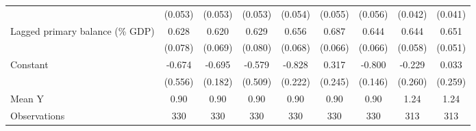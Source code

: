 {\begin{tabular}{l*{8}{c}}
                    &     (0.053)         &     (0.053)         &     (0.053)         &     (0.054)         &     (0.055)         &     (0.056)         &     (0.042)         &     (0.041)         \\
\addlinespace
Lagged primary balance (\% GDP)&       0.628\sym{***}&       0.620\sym{***}&       0.629\sym{***}&       0.656\sym{***}&       0.687\sym{***}&       0.644\sym{***}&       0.644\sym{***}&       0.651\sym{***}\\
                    &     (0.078)         &     (0.069)         &     (0.080)         &     (0.068)         &     (0.066)         &     (0.066)         &     (0.058)         &     (0.051)         \\
\addlinespace
Constant            &      -0.674         &      -0.695\sym{***}&      -0.579         &      -0.828\sym{***}&       0.317         &      -0.800\sym{***}&      -0.229         &       0.033         \\
                    &     (0.556)         &     (0.182)         &     (0.509)         &     (0.222)         &     (0.245)         &     (0.146)         &     (0.260)         &     (0.259)         \\
\midrule
Mean Y              &        0.90         &        0.90         &        0.90         &        0.90         &        0.90         &        0.90         &        1.24         &        1.24         \\
Observations        &         330         &         330         &         330         &         330         &         330         &         330         &         313         &         313         \\
\bottomrule
\end{tabular}
}
